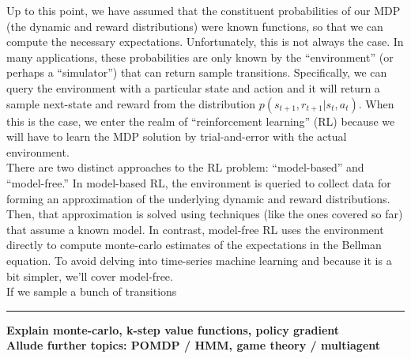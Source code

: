 Up to this point, we have assumed that the constituent probabilities of our MDP (the dynamic and reward distributions) were known functions, so that we can compute the necessary expectations. Unfortunately, this is not always the case. In many applications, these probabilities are only known by the ``environment'' (or perhaps a ``simulator'') that can return sample transitions. Specifically, we can query the environment with a particular state and action and it will return a sample next-state and reward from the distribution $p(s_{t+1}, r_{t+1}|s_t,a_t)$. When this is the case, we enter the realm of ``reinforcement learning'' (RL) because we will have to learn the MDP solution by trial-and-error with the actual environment.\\

There are two distinct approaches to the RL problem: ``model-based'' and ``model-free.'' In model-based RL, the environment is queried to collect data for forming an approximation of the underlying dynamic and reward distributions. Then, that approximation is solved using techniques (like the ones covered so far) that assume a known model. In contrast, model-free RL uses the environment directly to compute monte-carlo estimates of the expectations in the Bellman equation. To avoid delving into time-series machine learning and because it is a bit simpler, we'll cover model-free.\\

If we sample a bunch of transitions

\vspace{5ex}\hrule\vspace{2ex}

\textbf{Explain monte-carlo, k-step value functions, policy gradient}\\

\textbf{Allude further topics: POMDP / HMM, game theory / multiagent}



